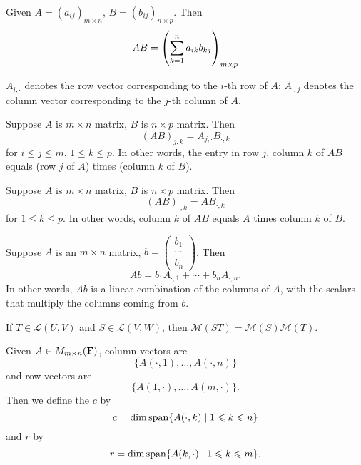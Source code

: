 \begin{definition}
Given $A=(a_{ij})_{m\times n}$, $B=(b_{ij})_{n\times p}$. Then
\[AB=\left(\sum_{k=1}^{n}a_{ik}b_{kj}\right)_{m\times p}\]
\end{definition}

\begin{notation}
$A_{i,\cdot}$ denotes the row vector corresponding to the $i$-th row of $A$; $A_{\cdot,j}$ denotes the column vector corresponding to the $j$-th column of $A$.
\end{notation}

\begin{proposition}
Suppose $A$ is $m\times n$ matrix, $B$ is $n\times p$ matrix. Then
\[(AB)_{j,k}=A_{j,\cdot}B_{\cdot,k}\]
for $i\le j\le m$, $1\le k\le p$. In other words, the entry in row $j$, column $k$ of $AB$ equals (row $j$ of $A$) times (column $k$ of $B$).
\end{proposition}

\begin{proposition}
Suppose $A$ is $m\times n$ matrix, $B$ is $n\times p$ matrix. Then
\[(AB)_{\cdot,k}=AB_{\cdot,k}\]
for $1\le k\le p$. In other words, column $k$ of $AB$ equals $A$ times column $k$ of $B$.
\end{proposition}

\begin{proposition}
Suppose $A$ is an $m\times n$ matrix, $b=\begin{pmatrix}
b_1\\\cdots\\b_n
\end{pmatrix}$. Then
\[Ab=b_1A_{\cdot,1}+\cdots+b_nA_{\cdot,n}.\]
In other words, $Ab$ is a linear combination of the columns of $A$, with the scalars that multiply the columns coming from $b$.
\end{proposition}

\begin{proposition}
If $T\in\mathcal{L}(U,V)$ and $S\in\mathcal{L}(V,W)$, then $\mathcal{M}(ST)=\mathcal{M}(S)\mathcal{M}(T)$.
\end{proposition}

\begin{definition}
Given $A\in M_{m\times n}(\mathbf F)$, column vectors are
\[\{A(\cdot,1),\dots,A(\cdot,n)\}\]
and row vectors are
\[\{A(1,\cdot),\dots,A(m,\cdot)\}.\]
Then we define the  $c$ by
\[c=\dim\operatorname{span}\{A(\cdot,k)\mid1\leqslant k\leqslant n\}\]
and  $r$ by
\[r=\dim\operatorname{span}\{A(k,\cdot)\mid1\leqslant k\leqslant m\}.\]
\end{definition}


